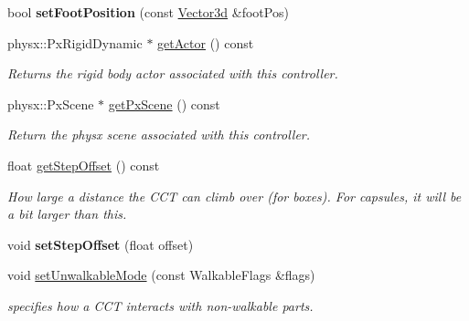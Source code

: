 \begin{Indent}
\begin{DoxyCompactItemize}
\mbox{\label{classrev_1_1_character_controller_a23934a17c6fd0c7272b8691ed53a4646}} 
bool {\bfseries set\+Foot\+Position} (const \mbox{\hyperlink{classrev_1_1_vector}{Vector3d}} \&foot\+Pos)
\item 
\mbox{\label{classrev_1_1_character_controller_a11f94a42457bc8e1b183af1c8aa0ecd7}} 
physx\+::\+Px\+Rigid\+Dynamic $\ast$ \mbox{\hyperlink{classrev_1_1_character_controller_a11f94a42457bc8e1b183af1c8aa0ecd7}{get\+Actor}} () const
\begin{DoxyCompactList}\small\item\em Returns the rigid body actor associated with this controller. \end{DoxyCompactList}\item 
\mbox{\label{classrev_1_1_character_controller_a256ff87e18a371dd66d913d4b0cfb313}} 
physx\+::\+Px\+Scene $\ast$ \mbox{\hyperlink{classrev_1_1_character_controller_a256ff87e18a371dd66d913d4b0cfb313}{get\+Px\+Scene}} () const
\begin{DoxyCompactList}\small\item\em Return the physx scene associated with this controller. \end{DoxyCompactList}\item 
\mbox{\label{classrev_1_1_character_controller_aa8e1bbcaf0dc8b08a375476121de5368}} 
float \mbox{\hyperlink{classrev_1_1_character_controller_aa8e1bbcaf0dc8b08a375476121de5368}{get\+Step\+Offset}} () const
\begin{DoxyCompactList}\small\item\em How large a distance the C\+CT can climb over (for boxes). For capsules, it will be a bit larger than this. \end{DoxyCompactList}\item 
\mbox{\label{classrev_1_1_character_controller_a00f852cadee64a0cd2e388ed0415046b}} 
void {\bfseries set\+Step\+Offset} (float offset)
\item 
void \mbox{\hyperlink{classrev_1_1_character_controller_afb094036c3828216a35d94d4116ef589}{set\+Unwalkable\+Mode}} (const Walkable\+Flags \&flags)
\begin{DoxyCompactList}\small\item\em specifies how a C\+CT interacts with non-\/walkable parts. \end{DoxyCompactList}\item 

\end{DoxyCompactItemize}
\end{Indent}

